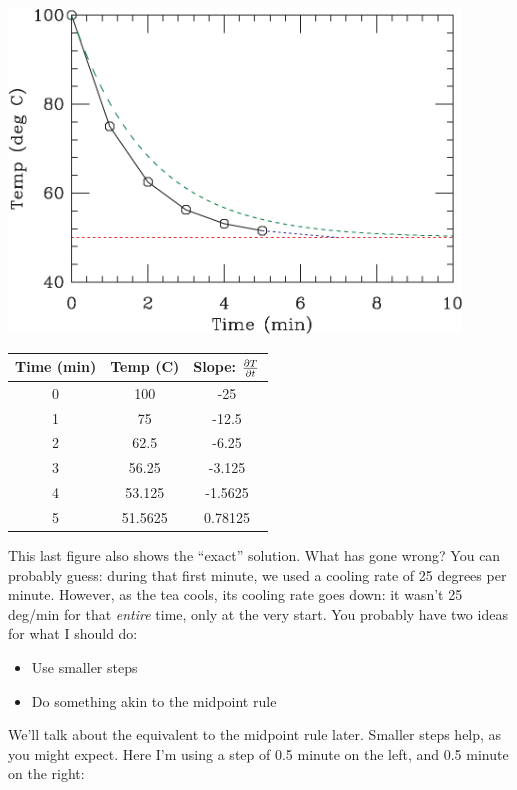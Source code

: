 \documentclass[12ampt]{article}
\def\PAR#1#2{ {{\partial #1}\over{\partial #2}} }
\begin{document}
\begin{minipage}{0.5\textwidth}
\includegraphics[width=0.9\textwidth]{fig5-crop.pdf}
\end{minipage}
\begin{minipage}{0.5\textwidth}
\begin{tabular}{|c | c | c |}
\hline
Time (min) & Temp (C) & Slope: $\PAR{T}{t}$ \\
\hline
0 & 100 & -25 \\
\hline
1 & 75 &  -12.5\\
\hline
2 & 62.5 & -6.25  \\
\hline
3 & 56.25 & -3.125 \\
\hline
4 & 53.125& -1.5625 \\
\hline
5 & 51.5625& 0.78125 \\
\hline
\end{tabular}
\end{minipage}

This last figure also shows the ``exact'' solution. What has gone wrong? You can
probably guess: during that first minute, we used a cooling rate of 25 degrees
per minute. However, as the tea cools, its cooling rate goes down: it wasn't 
25 deg/min for that {\it entire} time, only at the very start. You probably
have two ideas for what I should do:

\begin{itemize}
\item Use smaller steps
\item Do something akin to the midpoint rule
\end{itemize}

We'll talk about the equivalent to the midpoint rule later. Smaller steps help, as
you might expect. Here I'm using a step of 0.5 minute on the left, 
and 0.5 minute on the right:
\end{document}
